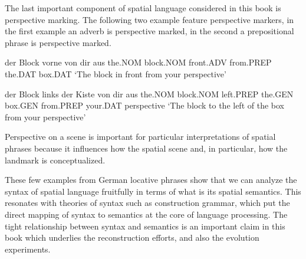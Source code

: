 The last important component of spatial language considered in this book
is perspective marking. The following two example feature perspective markers, in the first
example an adverb is perspective marked, in the second a prepositional
phrase is perspective marked.
\begin{example}
\label{e:der-block-vorne-von-dir-aus}
\gll der Block vorne von dir aus 
the.NOM block.NOM front.ADV from.PREP the.DAT box.DAT 
\glt `The block in front from your perspective'
\glend
\end{example}
\begin{example}
\label{e:der-block-links-der-kiste-von-dir-aus}
\gll der Block links der Kiste von dir aus 
the.NOM block.NOM left.PREP the.GEN box.GEN from.PREP your.DAT perspective 
\glt `The block to the left of the box from your perspective'
\glend
\end{example}
Perspective on a scene is important for particular interpretations
of spatial phrases because it influences how the spatial scene and, in 
particular, how the landmark is conceptualized. 



These few examples from German locative phrases show that 
we can analyze the syntax of spatial language 
fruitfully in terms of what is its spatial semantics. This resonates with 
theories of syntax such as construction grammar, which put the direct
mapping of syntax to semantics at the core of language processing.
The tight relationship between syntax and semantics is an important 
claim in this book which underlies the reconstruction efforts, and also
the evolution experiments. 

